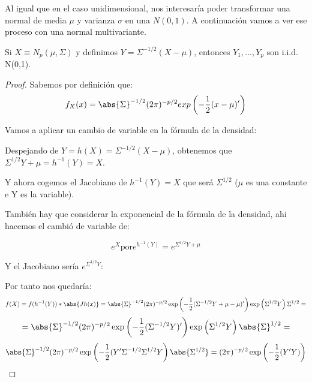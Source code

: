 Al igual que en el caso unidimensional, nos interesaría poder transformar una normal de media $μ$ y varianza $σ$ en una $N(0,1)$. A continuación vamos a ver ese proceso con una normal multivariante.


\begin{prop} Si $X \equiv N_p(\mu, \Sigma)$ y definimos $Y = \Sigma^{-1/2}(X-\mu)$, entonces $Y_1,...,Y_p$ son i.i.d. N(0,1).\end{prop}

\begin{proof}
Sabemos por definición que:
\[
f_X(x)=\abs{\Sigma}^{-1/2}(2\pi)^{-p/2} exp \left( -\frac{1}{2}(x-\mu)' \right)
\]

Vamos a aplicar un cambio de variable en la fórmula de la densidad:

Despejando de $Y = h(X)= \Sigma^{-1/2}(X-\mu)$, obtenemos que $\Sigma^{1/2}Y+\mu=h^{-1}(Y)=X$.

Y ahora cogemos el Jacobiano de $h^{-1}(Y)=X$ que será $\Sigma^{1/2}$ ($\mu$ es una constante e Y es la variable).

También hay que considerar la exponencial de la fórmula de la densidad, ahi hacemos el cambió de variable de:

$$e^X \text{por} e^{h^{-1}(Y)}=e^{\Sigma^{1/2}Y+\mu}$$

Y el Jacobiano sería $e^{\Sigma^{1/2}Y}$:


Por tanto nos quedaría:
\[
f(X) = f(h^{-1}(Y))*\abs{Jh(x)} = \abs{\Sigma}^{-1/2}(2 \pi)^{-p/2} \exp\left(-\frac{1}{2}(\Sigma^{-1/2}Y+\mu-\mu)'  \right) \exp\left( \Sigma^{1/2}Y \right) \Sigma^{1/2}  =
\]
\[
= \abs{\Sigma}^{-1/2}(2 \pi)^{-p/2} \exp\left(-\frac{1}{2}(\Sigma^{-1/2}Y)' \right) \exp\left( \Sigma^{1/2}Y \right) \abs{\Sigma}^{1/2} =
\]
\[
\abs{\Sigma}^{-1/2}(2 \pi)^{-p/2} \exp\left(-\frac{1}{2}(Y'\Sigma^{-1/2}\Sigma^{1/2}Y \right) \abs{\Sigma^{1/2}} = (2 \pi)^{-p/2} \exp\left(-\frac{1}{2}(Y'Y) \right)
\]
\end{proof}


